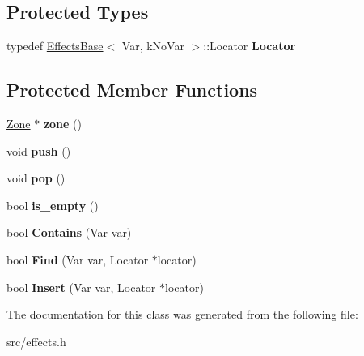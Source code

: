 \subsection*{Protected Types}
\begin{DoxyCompactItemize}
\item 
\hypertarget{classv8_1_1internal_1_1_nested_effects_base_a915cce4fbd939205a4486efc34b5d692}{}typedef \hyperlink{classv8_1_1internal_1_1_effects_base}{Effects\+Base}$<$ Var, k\+No\+Var $>$\+::Locator {\bfseries Locator}\label{classv8_1_1internal_1_1_nested_effects_base_a915cce4fbd939205a4486efc34b5d692}

\end{DoxyCompactItemize}
\subsection*{Protected Member Functions}
\begin{DoxyCompactItemize}
\item 
\hypertarget{classv8_1_1internal_1_1_nested_effects_base_a1829ea64f6cf50ec12bcf6c47fcb3342}{}\hyperlink{classv8_1_1internal_1_1_zone}{Zone} $\ast$ {\bfseries zone} ()\label{classv8_1_1internal_1_1_nested_effects_base_a1829ea64f6cf50ec12bcf6c47fcb3342}

\item 
\hypertarget{classv8_1_1internal_1_1_nested_effects_base_a42b0d67232ed75d03feca4898a78be14}{}void {\bfseries push} ()\label{classv8_1_1internal_1_1_nested_effects_base_a42b0d67232ed75d03feca4898a78be14}

\item 
\hypertarget{classv8_1_1internal_1_1_nested_effects_base_a8314d6c3c731945245facd496e9929ee}{}void {\bfseries pop} ()\label{classv8_1_1internal_1_1_nested_effects_base_a8314d6c3c731945245facd496e9929ee}

\item 
\hypertarget{classv8_1_1internal_1_1_nested_effects_base_a6e92c6847751fcabf62a9a40c493ba67}{}bool {\bfseries is\+\_\+empty} ()\label{classv8_1_1internal_1_1_nested_effects_base_a6e92c6847751fcabf62a9a40c493ba67}

\item 
\hypertarget{classv8_1_1internal_1_1_nested_effects_base_a08b80cebfece99559b3bc6c1f7faab94}{}bool {\bfseries Contains} (Var var)\label{classv8_1_1internal_1_1_nested_effects_base_a08b80cebfece99559b3bc6c1f7faab94}

\item 
\hypertarget{classv8_1_1internal_1_1_nested_effects_base_a65ad078fb3e5355a67bf51ba362469f2}{}bool {\bfseries Find} (Var var, Locator $\ast$locator)\label{classv8_1_1internal_1_1_nested_effects_base_a65ad078fb3e5355a67bf51ba362469f2}

\item 
\hypertarget{classv8_1_1internal_1_1_nested_effects_base_a73455f55cf3bbcf30867a19f6811ab92}{}bool {\bfseries Insert} (Var var, Locator $\ast$locator)\label{classv8_1_1internal_1_1_nested_effects_base_a73455f55cf3bbcf30867a19f6811ab92}

\end{DoxyCompactItemize}


The documentation for this class was generated from the following file\+:\begin{DoxyCompactItemize}
\item 
src/effects.\+h\end{DoxyCompactItemize}
